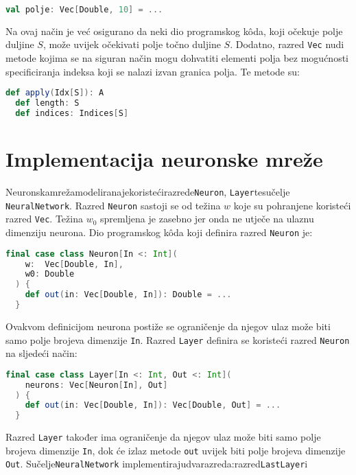 \begin{lstlisting}[language=scala,label={lst:lstlisting3}]
  val polje: Vec[Double, 10] = ...
\end{lstlisting}
Na ovaj način je već osigurano da neki dio programskog kôda, koji očekuje polje duljine $S$, može uvijek očekivati polje
točno duljine $S$. Dodatno, razred \texttt{Vec} nudi metode kojima se na siguran način mogu dohvatiti elementi polja
bez mogućnosti specificiranja indeksa koji se nalazi izvan granica polja. Te metode su:
\begin{lstlisting}[language=scala,label={lst:lstlisting4}]
  def apply(Idx[S]): A
  def length: S
  def indices: Indices[S]
\end{lstlisting}

\section*{Implementacija neuronske mreže}
Neuronska\hfill{}mreža\hfill{}modelirana\hfill{}je\hfill{}koristeći\hfill{}razrede\hfill{}\texttt{Neuron},\hfill{}
\texttt{Layer}\hfill{}te\hfill{}sučelje\\
\texttt{NeuralNetwork}. Razred \texttt{Neuron} sastoji se od težina $w$ koje su pohranjene koristeći razred
\texttt{Vec}. Težina $w_0$ spremljena je zasebno jer onda ne utječe na ulaznu dimenziju neurona. Dio programskog kôda
koji definira razred \texttt{Neuron} je:
\begin{lstlisting}[language=scala,label={lst:lstlisting5}]
  final case class Neuron[In <: Int](
    w:  Vec[Double, In],
    w0: Double
  ) {
    def out(in: Vec[Double, In]): Double = ...
  }
\end{lstlisting}
Ovakvom definicijom neurona postiže se ograničenje da njegov ulaz može biti samo polje brojeva dimenzije \texttt{In}.
Razred \texttt{Layer} definira se koristeći razred \texttt{Neuron} na sljedeći način:
\begin{lstlisting}[language=scala,label={lst:lstlisting6}]
  final case class Layer[In <: Int, Out <: Int](
    neurons: Vec[Neuron[In], Out]
  ) {
    def out(in: Vec[Double, In]): Vec[Double, Out] = ...
  }
\end{lstlisting}
Razred \texttt{Layer} također ima ograničenje da njegov ulaz može biti samo polje brojeva dimenzije \texttt{In}, dok će
izlaz metode \texttt{out} uvijek biti polje brojeva dimenzije \texttt{Out}. Sučelje\hfill{}\texttt{NeuralNetwork}
\hfill{}implementiraju\hfill{}dva\hfill{}razreda:\hfill{}razred\hfill{}\texttt{LastLayer}\hfill{}i\\
